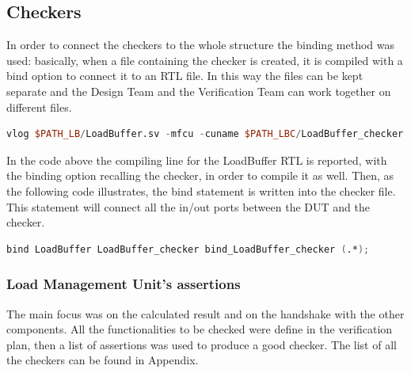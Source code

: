 \subsection{Checkers}
In order to connect the checkers to the whole structure the binding method was used: basically, when a file containing the checker is created, it is compiled with a bind option to connect it to an RTL file. In this way the files can be kept separate and the Design Team and the Verification Team can work together on different files. \cite{binding}
\begin{lstlisting}[language=Verilog,style=verilog-style, frame=l, numbers=none]
vlog $PATH_LB/LoadBuffer.sv -mfcu -cuname $PATH_LBC/LoadBuffer_checker.svh
\end{lstlisting}
In the code above the compiling line for the LoadBuffer RTL is reported, with the binding option recalling the checker, in order to compile it as well.
Then, as the following code illustrates, the bind statement is written into the checker file. This statement will connect all the in/out ports between the DUT and the checker. 
\begin{lstlisting}[language=Verilog,style=verilog-style, frame=l, numbers=none]
bind LoadBuffer LoadBuffer_checker bind_LoadBuffer_checker (.*);
\end{lstlisting}


\subsubsection{Load Management Unit's assertions}
The main focus was on the calculated result and on the handshake with the other components.
All the functionalities to be checked were define in the verification plan, then a list of assertions was used to produce a good checker.
The list of all the checkers can be found in Appendix.


